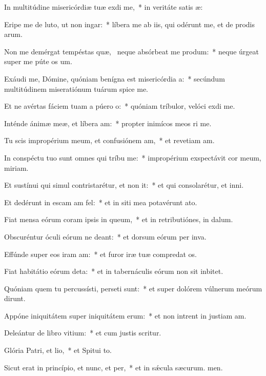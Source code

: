 \item In multitúdine misericórdiæ tuæ exdi me,~* in veritáte satis æ:
\item Eripe me de luto, ut non ingar:~* líbera me ab iis, qui odérunt me, et de prodis arum.
\item Non me demérgat tempéstas quæ,~\pscross{} neque absórbeat me produm:~* neque úrgeat super me púte os um.
\item Exáudi me, Dómine, quóniam benígna est misericórdia a:~* secúndum multitúdinem miseratiónum tuárum spice  me.
\item Et ne avértas fáciem tuam a púero o:~* quóniam tríbulor, velóci exdi me.
\item Inténde ánimæ meæ, et líbera am:~* propter inimícos meos ri me.
\item Tu scis impropérium meum, et confusiónem am,~* et revetiam am.
\item In conspéctu tuo sunt omnes qui tríbu me:~* impropérium exspectávit cor meum,  miriam.
\item Et sustínui qui simul contristarétur, et non it:~* et qui consolarétur, et  inni.
\item Et dedérunt in escam am fel:~* et in siti mea potavérunt  ato.
\item Fiat mensa eórum coram ipsis in queum,~* et in retributiónes,  in dalum.
\item Obscuréntur óculi eórum ne deant:~* et dorsum eórum per inva.
\item Effúnde super eos iram am:~* et furor iræ tuæ compredat os.
\item Fiat habitátio eórum deta:~* et in tabernáculis eórum non sit  inbitet.
\item Quóniam quem tu percussísti, perseti sunt:~* et super dolórem vúlnerum meórum dirunt.
\item Appóne iniquitátem super iniquitátem erum:~* et non intrent in justiam am.
\item Deleántur de libro vitium:~* et cum justis  scritur.
\item Glória Patri, et lio,~* et Spitui to.
\item Sicut erat in princípio, et nunc, et per,~* et in sǽcula sæcurum. men.
